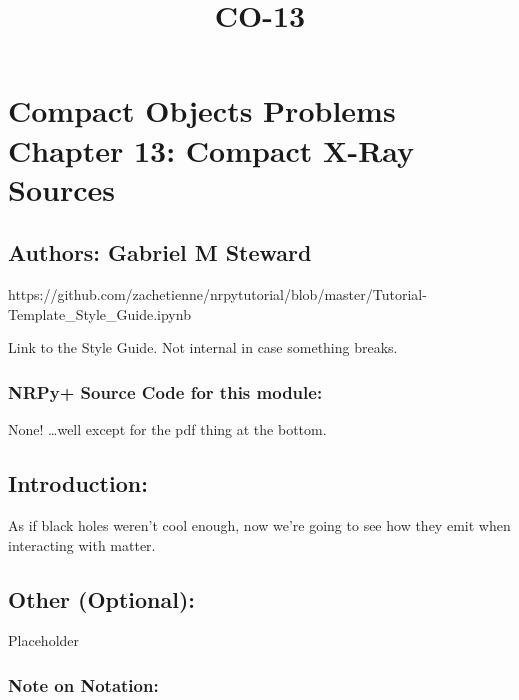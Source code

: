 \documentclass[landscape,letterpaper,10pt,english]{article}
\title{CO-13}
\begin{document}
    
    \maketitle
    
    

    
    \hypertarget{compact-objects-problems-chapter-13-compact-x-ray-sources}{%
\section{Compact Objects Problems Chapter 13: Compact X-Ray
Sources}\label{compact-objects-problems-chapter-13-compact-x-ray-sources}}

\hypertarget{authors-gabriel-m-steward}{%
\subsection{Authors: Gabriel M
Steward}\label{authors-gabriel-m-steward}}

    https://github.com/zachetienne/nrpytutorial/blob/master/Tutorial-Template\_Style\_Guide.ipynb

Link to the Style Guide. Not internal in case something breaks.

    \hypertarget{nrpy-source-code-for-this-module}{%
\subsubsection{\texorpdfstring{ NRPy+ Source Code for this
module:}{ NRPy+ Source Code for this module:}}\label{nrpy-source-code-for-this-module}}

None! \ldots well except for the pdf thing at the bottom.

\hypertarget{introduction}{%
\subsection{Introduction:}\label{introduction}}

As if black holes weren't cool enough, now we're going to see how they
emit when interacting with matter.

\hypertarget{other-optional}{%
\subsection{\texorpdfstring{ Other
(Optional):}{ Other (Optional):}}\label{other-optional}}

Placeholder

\hypertarget{note-on-notation}{%
\subsubsection{Note on Notation:}\label{note-on-notation}}
\end{document}

